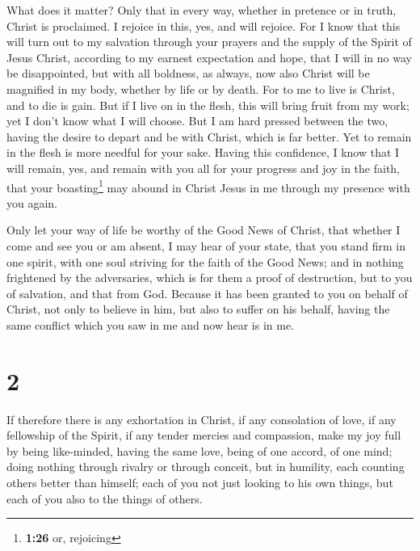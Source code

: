  What does it matter? Only that in every way, whether in
pretence or in truth, Christ is proclaimed. I rejoice in this, yes, and
will rejoice.  For I know that this will turn out to my
salvation through your prayers and the supply of the Spirit of Jesus
Christ,  according to my earnest expectation and hope,
that I will in no way be disappointed, but with all boldness, as always,
now also Christ will be magnified in my body, whether by life or by
death.  For to me to live is Christ, and to die is gain.
 But if I live on in the flesh, this will bring fruit
from my work; yet I don't know what I will choose.  But I
am hard pressed between the two, having the desire to depart and be with
Christ, which is far better.  Yet to remain in the flesh
is more needful for your sake.  Having this confidence, I
know that I will remain, yes, and remain with you all for your progress
and joy in the faith,  that your boasting\footnote{\textbf{1:26}
  or, rejoicing} may abound in Christ Jesus in me through my presence
with you again.

 Only let your way of life be worthy of the Good News of
Christ, that whether I come and see you or am absent, I may hear of your
state, that you stand firm in one spirit, with one soul striving for the
faith of the Good News;  and in nothing frightened by the
adversaries, which is for them a proof of destruction, but to you of
salvation, and that from God.  Because it has been
granted to you on behalf of Christ, not only to believe in him, but also
to suffer on his behalf,  having the same conflict which
you saw in me and now hear is in me.

\hypertarget{section-1}{%
\section{2}\label{section-1}}

 If therefore there is any exhortation in Christ, if any
consolation of love, if any fellowship of the Spirit, if any tender
mercies and compassion,  make my joy full by being
like-minded, having the same love, being of one accord, of one mind;
 doing nothing through rivalry or through conceit, but in
humility, each counting others better than himself;  each
of you not just looking to his own things, but each of you also to the
things of others.

